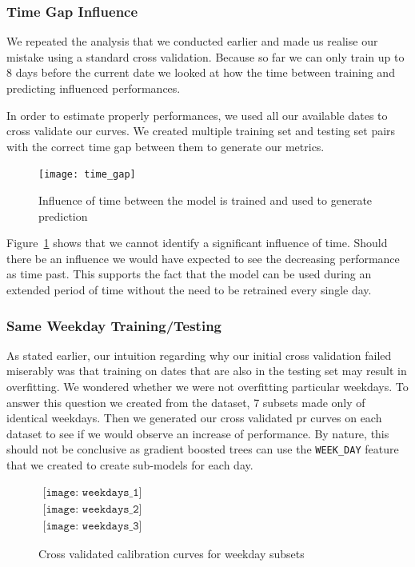 \subsubsection{Time Gap Influence}
We repeated the analysis that we conducted earlier and made us realise our mistake using a standard cross validation. Because so far we can only train up to 8 days before the current date we looked at how the time between training and predicting influenced performances.

In order to estimate properly performances, we used all our available dates to cross validate our curves. We created multiple training set and testing set pairs with the correct time gap between them to generate our metrics. 

\begin{figure}[ht]
    \begin{center}
    \texttt{[image: time\_gap]}
    \end{center}
    \caption{Influence of time between the model is trained and used to generate prediction}
    \label{time_gap}
\end{figure}

Figure~\ref{time_gap} shows that we cannot identify a significant influence of time. Should there be an influence we would have expected to see the decreasing performance as time past. This supports the fact that the model can be used during an extended period of time without the need to be retrained every single day. 

\subsubsection{Same Weekday Training/Testing}
As stated earlier, our intuition regarding why our initial cross validation failed miserably was that training on dates that are also in the testing set may result in overfitting. We wondered whether we were not overfitting particular weekdays. To answer this question we created from the dataset, 7 subsets made only of identical weekdays. Then we generated our cross validated \acrshort{pr} curves on each dataset to see if we would observe an increase of performance. By nature, this should not be conclusive as gradient boosted trees can use the \texttt{WEEK\_DAY} feature that we created to create sub-models for each day. 

\begin{figure}[h]
\begin{center}$
\begin{array}{c}
\texttt{[image: weekdays\_1]} \\
\texttt{[image: weekdays\_2]} \\
\texttt{[image: weekdays\_3]} 
\end{array}$
\end{center}
\caption{\label{weekdays} Cross validated calibration curves for weekday subsets}
\end{figure}

